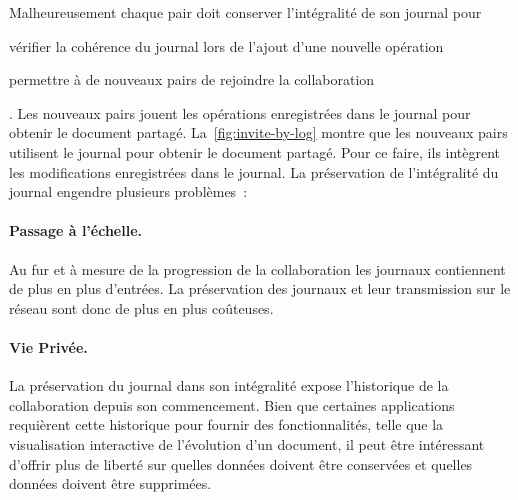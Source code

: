 Malheureusement chaque pair doit conserver l'intégralité de son journal pour \begin{inlinelist}
    \item vérifier la cohérence du journal lors de l'ajout d'une nouvelle opération
    \item permettre à de nouveaux pairs de rejoindre la collaboration
\end{inlinelist}.
Les nouveaux pairs jouent les opérations enregistrées dans le journal pour obtenir le document partagé.
La~\autoref{fig:invite-by-log} montre que les nouveaux pairs utilisent le journal pour obtenir le document partagé.
Pour ce faire, ils intègrent les modifications enregistrées dans le journal.
La préservation de l'intégralité du journal engendre plusieurs problèmes~:

\paragraph{Passage à l'échelle.} Au fur et à mesure de la progression de la collaboration les journaux contiennent de plus en plus d'entrées.
La préservation des journaux et leur transmission sur le réseau sont donc de plus en plus coûteuses.

\paragraph{Vie Privée.} La préservation du journal dans son intégralité expose l'historique de la collaboration depuis son commencement.
Bien que certaines applications requièrent cette historique pour fournir des fonctionnalités, telle que la visualisation interactive de l'évolution d'un document, il peut être intéressant d'offrir plus de liberté sur quelles données doivent être conservées et quelles données doivent être supprimées.

\bigskip

